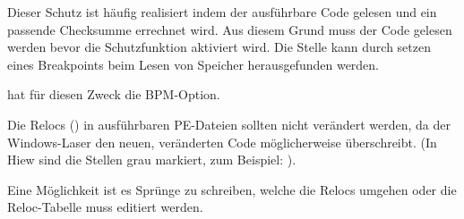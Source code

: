 Dieser Schutz ist häufig realisiert indem der ausführbare Code gelesen und ein
passende Checksumme errechnet wird.
Aus diesem Grund muss der Code gelesen werden bevor die Schutzfunktion aktiviert
wird. Die Stelle kann durch setzen eines Breakpoints beim Lesen von Speicher
herausgefunden werden.

\tracer hat für diesen Zweck die BPM-Option.

Die Relocs () in ausführbaren PE-Dateien sollten nicht
verändert werden, da der Windows-Laser den neuen, veränderten Code möglicherweise
überschreibt.
(In Hiew sind die Stellen grau markiert, zum Beispiel: ).

Eine Möglichkeit ist es Sprünge zu schreiben, welche die Relocs umgehen oder die
Reloc-Tabelle muss editiert werden.
